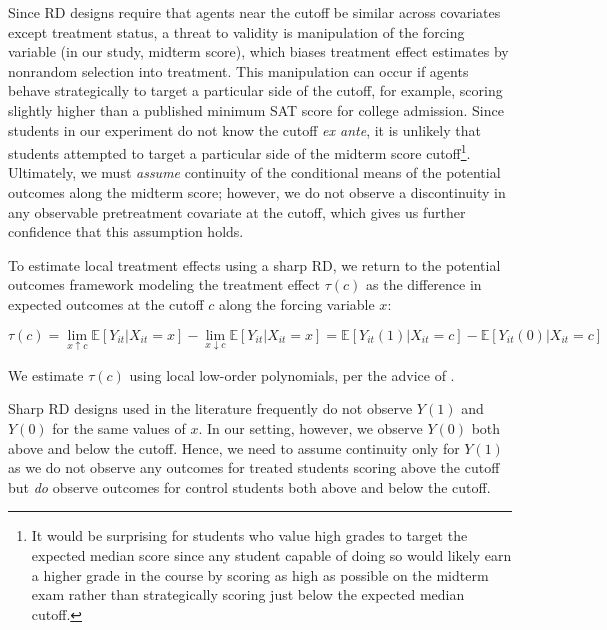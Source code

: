 \documentclass[12pt]{article}
\begin{document}
Since RD designs require that agents near the cutoff be similar across covariates except treatment status, a threat to validity is manipulation of the forcing variable (in our study, midterm score), which biases treatment effect estimates by nonrandom selection into treatment. This manipulation can occur if agents behave strategically to target a particular side of the cutoff, for example, scoring slightly higher than a published minimum SAT score for college admission. Since students in our experiment do not know the cutoff \textit{ex ante}, it is unlikely that students attempted to target a particular side of the midterm score cutoff\footnote{It would be surprising for students who value high grades to target the expected median score since any student capable of doing so would likely earn a higher grade in the course by scoring as high as possible on the midterm exam rather than strategically scoring just below the expected median cutoff.}. Ultimately, we must \textit{assume} continuity of the conditional means of the potential outcomes along the midterm score; however, we do not observe a discontinuity in any observable pretreatment covariate at the cutoff, which gives us further confidence that this assumption holds.

To estimate local treatment effects using a sharp RD, we return to the potential outcomes framework modeling the treatment effect $\tau(c)$ as the difference in expected outcomes at the cutoff $c$ along the forcing variable $x$:

\begin{equation} \label{rd_po}
	\tau(c) = \lim_{x \uparrow c} \mathbb{E}[Y_{it} | X_{it} = x] - \lim_{x \downarrow c} \mathbb{E}[Y_{it} | X_{it} = x] = \mathbb{E}[Y_{it}(1) | X_{it} = c] - \mathbb{E}[Y_{it}(0) | X_{it} = c]
\end{equation}

We estimate $\tau(c)$ using local low-order polynomials, per the advice of \textcite{gi2019}.

Sharp RD designs used in the literature frequently do not observe $Y(1)$ and $Y(0)$ for the same values of $x$. In our setting, however, we observe $Y(0)$ both above and below the cutoff. Hence, we need to assume continuity only for $Y(1)$ as we do not observe any outcomes for treated students scoring above the cutoff but \textit{do} observe outcomes for control students both above and below the cutoff.



\end{document}
